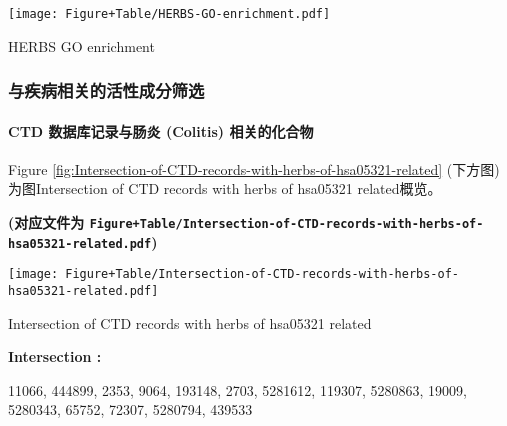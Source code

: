 \documentclass[
]{article}
\begin{document}
\def\@captype{figure}
\begin{center}
\texttt{[image: Figure+Table/HERBS-GO-enrichment.pdf]}
\caption{HERBS GO enrichment}\label{fig:HERBS-GO-enrichment}
\end{center}

\hypertarget{ux4e0eux75beux75c5ux76f8ux5173ux7684ux6d3bux6027ux6210ux5206ux7b5bux9009}{%
\subsubsection{与疾病相关的活性成分筛选}\label{ux4e0eux75beux75c5ux76f8ux5173ux7684ux6d3bux6027ux6210ux5206ux7b5bux9009}}

\hypertarget{ctd-ux6570ux636eux5e93ux8bb0ux5f55ux4e0eux80a0ux708e-colitis-ux76f8ux5173ux7684ux5316ux5408ux7269}{%
\paragraph{CTD 数据库记录与肠炎 (Colitis) 相关的化合物}\label{ctd-ux6570ux636eux5e93ux8bb0ux5f55ux4e0eux80a0ux708e-colitis-ux76f8ux5173ux7684ux5316ux5408ux7269}}

Figure \ref{fig:Intersection-of-CTD-records-with-herbs-of-hsa05321-related} (下方图) 为图Intersection of CTD records with herbs of hsa05321 related概览。

\textbf{(对应文件为 \texttt{Figure+Table/Intersection-of-CTD-records-with-herbs-of-hsa05321-related.pdf})}

\def\@captype{figure}
\begin{center}
\texttt{[image: Figure+Table/Intersection-of-CTD-records-with-herbs-of-hsa05321-related.pdf]}
\caption{Intersection of CTD records with herbs of hsa05321 related}\label{fig:Intersection-of-CTD-records-with-herbs-of-hsa05321-related}
\end{center}
\begin{center}\begin{tcolorbox}[colback=gray!10, colframe=gray!50, width=0.9\linewidth, arc=1mm, boxrule=0.5pt]
\textbf{
Intersection
:}

\vspace{0.5em}

    11066, 444899, 2353, 9064, 193148, 2703, 5281612,
119307, 5280863, 19009, 5280343, 65752, 72307, 5280794,
439533

\vspace{2em}
\end{tcolorbox}
\end{center}
\end{document}
